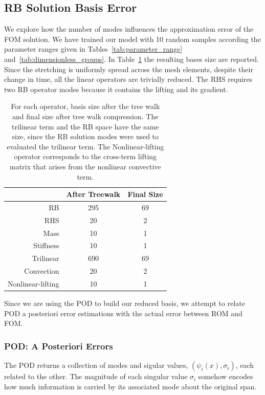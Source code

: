 \documentclass[../../thesis.tex]{subfiles}
\begin{document}
\subsection{RB Solution Basis Error}
\label{sec:hrom_results_reduced_basis}
We explore how the number of modes influences the approximation error of the FOM solution.
We have trained our model with 10 random samples according the parameter ranges given in
Tables~\ref{tab:parameter_range} and~\ref{tab:dimensionless_groups}.  
In Table~\ref{tab:uniform_stretching_basis_size} the resulting bases size are reported.
Since the stretching is uniformly spread across the mesh elements, despite their change in time,
all the linear operators are trivially reduced.
The RHS requires two RB operator modes because it contains the lifting and its gradient.
\begin{table}[!h]
    \caption{For each operator,
    basis size after the tree walk and final size after tree walk compression.
    The trilinear term and the RB space have the same size, 
    since the RB solution modes were used to evaluated the trilinear term.
    The Nonlinear-lifting operator corresponds to the cross-term lifting matrix
    that arises from the nonlinear convective term.}
    \centering
    \begin{tabular}{@{}rcc@{}}
    \toprule
                      & After Treewalk & Final Size \\ \midrule
    RB                & 295            & 69                \\
    RHS               & 20             & 2                 \\
    Mass              & 10             & 1                 \\
    Stiffness         & 10             & 1                 \\
    Trilinear         & 690            & 69                \\
    Convection        & 20             & 2                 \\
    Nonlinear-lifting & 10             & 1                 \\ \bottomrule
    \end{tabular}
    \label{tab:uniform_stretching_basis_size}
\end{table}
Since we are using the POD to build our reduced basis, 
we attempt to relate POD a posteriori error estimations with 
the actual error between ROM and FOM.

\subsubsection{POD: A Posteriori Errors}
The POD returns a collection of modes and sigular values, 
$(\psi_i(x), \sigma_i)$,
each related to the other.
The magnitude of each singular value $\sigma_i$ somehow encodes 
how much information is carried by its associated mode about the original span.
\end{document}
